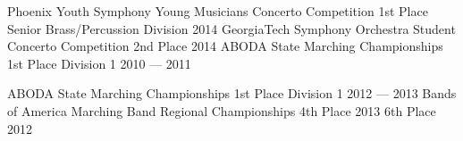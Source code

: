 \begin{minipage}[t]{0.2\textwidth}
	\flushleft
\end{minipage}
\begin{minipage}[t]{0.75\textwidth}
	{
		\competition
		{Phoenix Youth Symphony Young Musicians Concerto Competition}
		{1st Place Senior Brass/Percussion Division}
		{2014}
		\competition
		{GeorgiaTech Symphony Orchestra Student Concerto Competition}
		{2nd Place}
		{2014}
		\competition
		{ABODA State Marching Championships}
		{1st Place Division 1}
		{2010 --- 2011}
	}

	\vspace*{-14pt}
	{
		\competition
		{ABODA State Marching Championships}
		{1st Place Division 1}
		{2012 --- 2013}
		\competition
		{Bands of America Marching Band Regional Championships}
		{4th Place}
		{2013}
		\addplace
		{6th Place}
		{2012}

	}

	\vspace*{-14pt}
\end{minipage}

\vspace{8pt}